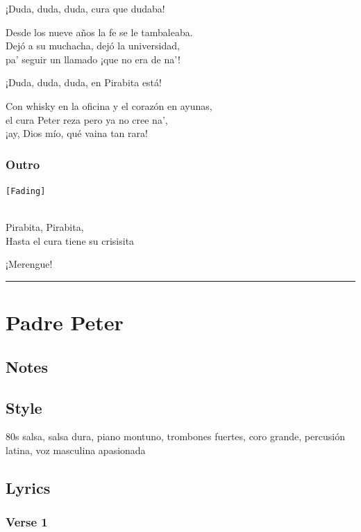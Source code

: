 ¡Duda, duda, duda, cura que dudaba!

Desde los nueve años la fe se le tambaleaba.\\
Dejó a su muchacha, dejó la universidad,\\
pa' seguir un llamado ¡que no era de na'!

¡Duda, duda, duda, en Pirabita está!

Con whisky en la oficina y el corazón en ayunas,\\
el cura Peter reza pero ya no cree na',\\
¡ay, Dios mío, qué vaina tan rara!

\subsubsection{Outro}\label{outro-6}

\texttt{{[}Fading{]}}\strut \\
Pirabita, Pirabita,\\
Hasta el cura tiene su crisisita

¡Merengue!

\begin{center}\rule{0.5\linewidth}{0.5pt}\end{center}

\section{Padre Peter}\label{padre-peter}

\subsection{Notes}\label{notes-23}

\subsection{Style}\label{style-22}

80s salsa, salsa dura, piano montuno, trombones fuertes, coro grande,
percusión latina, voz masculina apasionada

\subsection{Lyrics}\label{lyrics-22}

\subsubsection{Verse 1}\label{verse-1-14}

